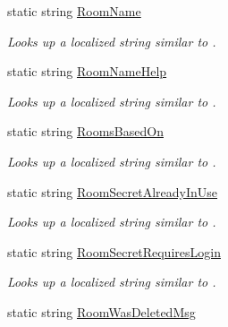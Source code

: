 \begin{DoxyCompactItemize}
static string \hyperlink{class_wis_r_1_1_app___resources_1_1_resource_a739ebb892d03a5ad2124028061c6af2c}{Room\+Name}
\begin{DoxyCompactList}\small\item\em Looks up a localized string similar to . \end{DoxyCompactList}\item 
static string \hyperlink{class_wis_r_1_1_app___resources_1_1_resource_a3b6a4e008bc41b09a79baca154a132b6}{Room\+Name\+Help}
\begin{DoxyCompactList}\small\item\em Looks up a localized string similar to . \end{DoxyCompactList}\item 
static string \hyperlink{class_wis_r_1_1_app___resources_1_1_resource_a3f421217b8a91f567e91641ed754dfc3}{Rooms\+Based\+On}
\begin{DoxyCompactList}\small\item\em Looks up a localized string similar to . \end{DoxyCompactList}\item 
static string \hyperlink{class_wis_r_1_1_app___resources_1_1_resource_ac7f92aa455ecf479e5c20ea5693c1f3b}{Room\+Secret\+Already\+In\+Use}
\begin{DoxyCompactList}\small\item\em Looks up a localized string similar to . \end{DoxyCompactList}\item 
static string \hyperlink{class_wis_r_1_1_app___resources_1_1_resource_a3235afd2fea62a7c516cf83cd884b5e7}{Room\+Secret\+Requires\+Login}
\begin{DoxyCompactList}\small\item\em Looks up a localized string similar to . \end{DoxyCompactList}\item 
static string \hyperlink{class_wis_r_1_1_app___resources_1_1_resource_a032a634fb6f21bb649504f72b8f30784}{Room\+Was\+Deleted\+Msg}

\end{DoxyCompactItemize}
